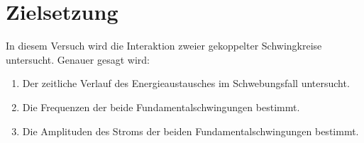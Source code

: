 \section{Zielsetzung}
\label{sec:Zielsetzung}

In diesem Versuch wird die Interaktion zweier gekoppelter Schwingkreise untersucht.
Genauer gesagt wird:
\begin{enumerate}[label=\alph*)]
    \item Der zeitliche Verlauf des Energieaustausches im Schwebungsfall untersucht.
    \item Die Frequenzen der beide Fundamentalschwingungen bestimmt.
    \item Die Amplituden des Stroms der beiden Fundamentalschwingungen bestimmt.
\end{enumerate}